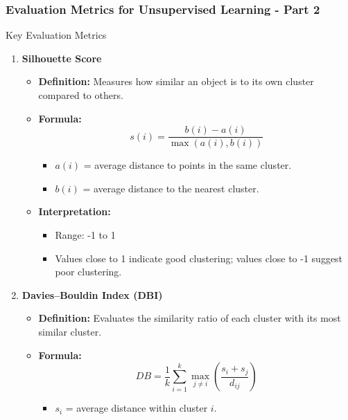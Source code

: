 \documentclass[aspectratio=169]{beamer}
\begin{document}
\begin{frame}[fragile]
    \frametitle{Evaluation Metrics for Unsupervised Learning - Part 2}
    \begin{block}{Key Evaluation Metrics}
        \begin{enumerate}
            \item \textbf{Silhouette Score}
            \begin{itemize}
                \item \textbf{Definition:} Measures how similar an object is to its own cluster compared to others.
                \item \textbf{Formula:}
                \begin{equation}
                s(i) = \frac{b(i) - a(i)}{\max(a(i), b(i))}
                \end{equation}
                \begin{itemize}
                    \item \(a(i)\) = average distance to points in the same cluster.
                    \item \(b(i)\) = average distance to the nearest cluster.
                \end{itemize}
                \item \textbf{Interpretation:}
                \begin{itemize}
                    \item Range: -1 to 1
                    \item Values close to 1 indicate good clustering; values close to -1 suggest poor clustering.
                \end{itemize}
            \end{itemize}
            \item \textbf{Davies–Bouldin Index (DBI)}
            \begin{itemize}
                \item \textbf{Definition:} Evaluates the similarity ratio of each cluster with its most similar cluster.
                \item \textbf{Formula:}
                \begin{equation}
                DB = \frac{1}{k} \sum_{i=1}^{k} \max_{j \neq i} \left( \frac{s_i + s_j}{d_{ij}} \right)
                \end{equation}
                \begin{itemize}
                    \item \(s_i\) = average distance within cluster \(i\).

\end{itemize}
\end{itemize}
\end{enumerate}
\end{block}
\end{frame}
\end{document}
